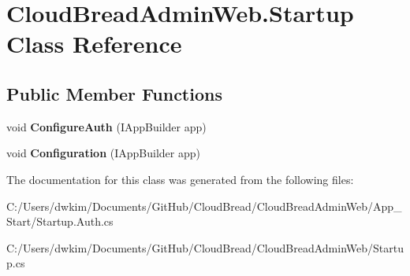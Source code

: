 \hypertarget{a00184}{}\section{Cloud\+Bread\+Admin\+Web.\+Startup Class Reference}
\label{a00184}
\subsection*{Public Member Functions}
\begin{DoxyCompactItemize}
\item 
void {\bfseries Configure\+Auth} (I\+App\+Builder app)\hypertarget{a00184_a0f98aec83695a6a56de65a11ed85faeb}{}\label{a00184_a0f98aec83695a6a56de65a11ed85faeb}

\item 
void {\bfseries Configuration} (I\+App\+Builder app)\hypertarget{a00184_a33199b2950e6de586c0d56f125eefe62}{}\label{a00184_a33199b2950e6de586c0d56f125eefe62}

\end{DoxyCompactItemize}


The documentation for this class was generated from the following files\+:\begin{DoxyCompactItemize}
\item 
C\+:/\+Users/dwkim/\+Documents/\+Git\+Hub/\+Cloud\+Bread/\+Cloud\+Bread\+Admin\+Web/\+App\+\_\+\+Start/Startup.\+Auth.\+cs\item 
C\+:/\+Users/dwkim/\+Documents/\+Git\+Hub/\+Cloud\+Bread/\+Cloud\+Bread\+Admin\+Web/Startup.\+cs\end{DoxyCompactItemize}
